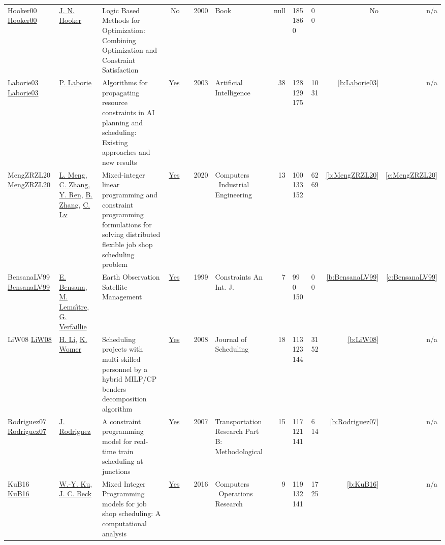 {\begin{longtable}{>{\raggedright\arraybackslash}p{3cm}>{\raggedright\arraybackslash}p{4.5cm}>{\raggedright\arraybackslash}p{6.0cm}rrrp{2.5cm}rp{1cm}p{1cm}rr}
Hooker00 \href{http://dx.doi.org/10.1002/9781118033036}{Hooker00} & \hyperref[auth:a160]{J. N. Hooker} & Logic Based Methods for Optimization: Combining Optimization and Constraint Satisfaction & No & \cite{Hooker00} & 2000 & Book & null & 185 186 0 & 0 0 & No & n/a\\
Laborie03 \href{http://dx.doi.org/10.1016/s0004-3702(02)00362-4}{Laborie03} & \hyperref[auth:a118]{P. Laborie} & \cellcolor{gold!20}Algorithms for propagating resource constraints in AI planning and scheduling: Existing approaches and new results & \href{../works/Laborie03.pdf}{Yes} & \cite{Laborie03} & 2003 & Artificial Intelligence & 38 & 128 129 175 & 10 31 & \ref{b:Laborie03} & n/a\\
MengZRZL20 \href{https://doi.org/10.1016/j.cie.2020.106347}{MengZRZL20} & \hyperref[auth:a500]{L. Meng}, \hyperref[auth:a501]{C. Zhang}, \hyperref[auth:a502]{Y. Ren}, \hyperref[auth:a503]{B. Zhang}, \hyperref[auth:a504]{C. Lv} & Mixed-integer linear programming and constraint programming formulations for solving distributed flexible job shop scheduling problem & \href{../works/MengZRZL20.pdf}{Yes} & \cite{MengZRZL20} & 2020 & Computers \  Industrial Engineering & 13 & 100 133 152 & 62 69 & \ref{b:MengZRZL20} & \ref{c:MengZRZL20}\\
BensanaLV99 \href{https://doi.org/10.1023/A:1026488509554}{BensanaLV99} & \hyperref[auth:a171]{E. Bensana}, \hyperref[auth:a172]{M. Lema{\^{\i}}tre}, \hyperref[auth:a173]{G. Verfaillie} & Earth Observation Satellite Management & \href{../works/BensanaLV99.pdf}{Yes} & \cite{BensanaLV99} & 1999 & Constraints An Int. J. & 7 & 99 0 150 & 0 0 & \ref{b:BensanaLV99} & \ref{c:BensanaLV99}\\
LiW08 \href{http://dx.doi.org/10.1007/s10951-008-0079-3}{LiW08} & \hyperref[auth:a953]{H. Li}, \hyperref[auth:a954]{K. Womer} & Scheduling projects with multi-skilled personnel by a hybrid MILP/CP benders decomposition algorithm & \href{../works/LiW08.pdf}{Yes} & \cite{LiW08} & 2008 & Journal of Scheduling & 18 & 113 123 144 & 31 52 & \ref{b:LiW08} & n/a\\
Rodriguez07 \href{https://www.sciencedirect.com/science/article/pii/S0191261506000233}{Rodriguez07} & \hyperref[auth:a781]{J. Rodriguez} & A constraint programming model for real-time train scheduling at junctions & \href{../works/Rodriguez07.pdf}{Yes} & \cite{Rodriguez07} & 2007 & Transportation Research Part B: Methodological & 15 & 117 121 141 & 6 14 & \ref{b:Rodriguez07} & n/a\\
KuB16 \href{https://doi.org/10.1016/j.cor.2016.04.006}{KuB16} & \hyperref[auth:a331]{W.-Y. Ku}, \hyperref[auth:a89]{J. C. Beck} & \cellcolor{green!10}Mixed Integer Programming models for job shop scheduling: {A} computational analysis & \href{../works/KuB16.pdf}{Yes} & \cite{KuB16} & 2016 & Computers \  Operations Research & 9 & 119 132 141 & 17 25 & \ref{b:KuB16} & n/a\\

\end{longtable}}
